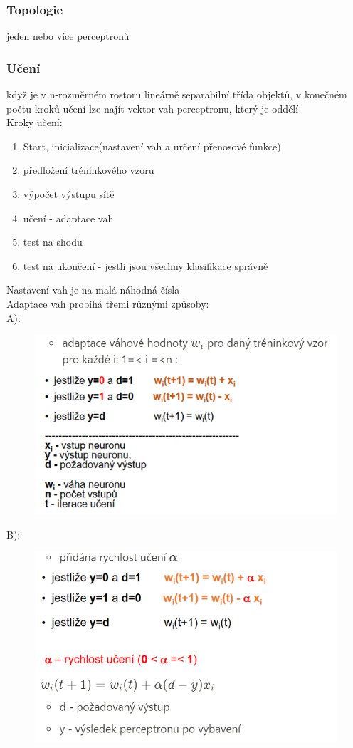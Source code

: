 \subsubsection{Topologie}
jeden nebo více perceptronů
\subsubsection{Učení}
když je v n-rozměrném rostoru lineárně separabilní třída objektů, v konečném počtu kroků učení lze najít vektor vah perceptronu, který je oddělí\\
Kroky učení:
\begin{enumerate}
    \item Start, inicializace(nastavení vah a určení přenosové funkce)
    \item předložení tréninkového vzoru
    \item výpočet výstupu sítě
    \item učení - adaptace vah
    \item test na shodu
    \item test na ukončení - jestli jsou všechny klasifikace správně
\end{enumerate}
Nastavení vah je na malá náhodná čísla\\
Adaptace vah probíhá třemi různými způsoby:\\
A):
\begin{figure}[H]
    \includegraphics[scale = 0.7]{images/perceptron_vahy1.png}
\end{figure}
B):
\begin{figure}[H]
    \includegraphics[scale = 0.7]{images/perceptron_vahy2.png}
\end{figure}
